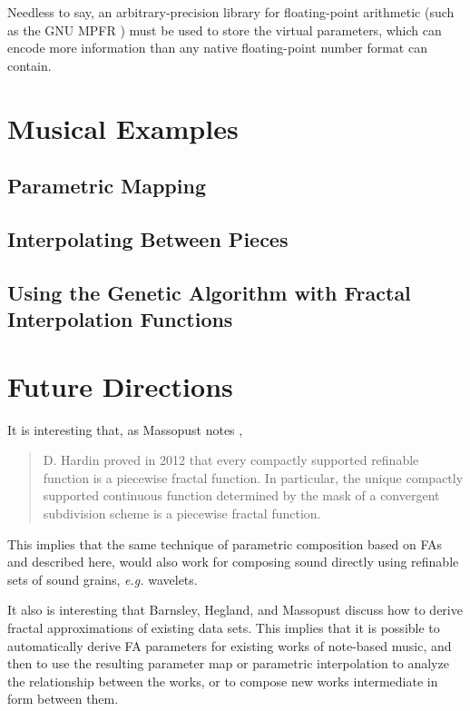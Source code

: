 \documentclass[english,11pt,letterpaper,onecolumn]{scrartcl}
\numberwithin{equation}{section}
\begin{document}
Needless to say, an arbitrary-precision library for floating-point arithmetic
(such as the GNU MPFR \cite{Fousse:2007:MMB:1236463.1236468}) must be used to
store the virtual parameters, which can encode more information than any native
floating-point number format can contain.

\section{Musical Examples}

\subsection{Parametric Mapping}

\subsection{Interpolating Between Pieces}

\subsection{Using the Genetic Algorithm with Fractal Interpolation
Functions}

\section{Future Directions}

It is interesting that, as Massopust notes \cite{massopust2017}, \begin{quote}D.
Hardin proved in 2012 that every compactly supported refinable function is a
piecewise fractal function. In particular, the unique compactly supported
continuous function determined by the mask of a convergent subdivision scheme is
a piecewise fractal function. \end{quote} This implies that the same technique
of parametric composition based on FAs and described here, would also work for
composing sound directly using refinable sets of sound grains, \textit{e.g.}
wavelets.

It also is interesting that Barnsley, Hegland, and Massopust
\cite{2013arXiv1309.0972B} discuss how to derive fractal approximations of
existing data sets. This implies that it is possible to automatically derive FA
parameters for existing works of note-based music, and then to use the resulting
parameter map or parametric interpolation to analyze the relationship between
the works, or to compose new works intermediate in form between them.

\printbibliography
\end{document}
